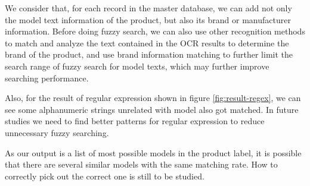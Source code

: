 \documentclass[technicalreport]{ieicej}
\begin{document}
    We consider that, for each record in the master database, we can add not only the model text information of the product, but also its brand or manufacturer information. Before doing fuzzy search, we can also use other recognition methods to match and analyze the text contained in the OCR results to determine the brand of the product, and use brand information matching to further limit the search range of fuzzy search for model texts, which may further improve searching performance.

    Also, for the result of regular expression shown in figure \ref{fig:result-regex}, we can see some alphanumeric strings unrelated with model also got matched. In future studies we need to find better patterns for regular expression to reduce unnecessary fuzzy searching.

    As our output is a list of most possible models in the product label, it is possible that there are several similar models with the same matching rate. How to correctly pick out the correct one is still to be studied.
\end{document}
